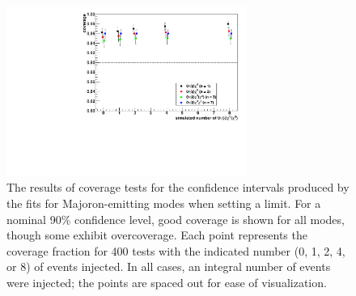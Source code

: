 \documentclass[herrin-thesis.tex]{subfiles}
\begin{document}
\begin{figure}[htp]
\centering
\includegraphics[width=0.7\textwidth]{./plots/analysis_bb0nX_coverage.pdf}
\caption[Coverage tests for \zeronuXpX{}]{The results of coverage tests for the confidence intervals produced by the fits for Majoron-emitting modes when setting a limit. For a nominal 90\% confidence level, good coverage is shown for all modes, though some exhibit overcoverage. Each point represents the coverage fraction for 400 tests with the indicated number (0, 1, 2, 4, or 8) of \zeronuXpX{} events injected. In all cases, an integral number of events were injected; the points are spaced out for ease of visualization.}
\label{fig:analysis_bb0nX_coverage}
\end{figure}
\end{document}
